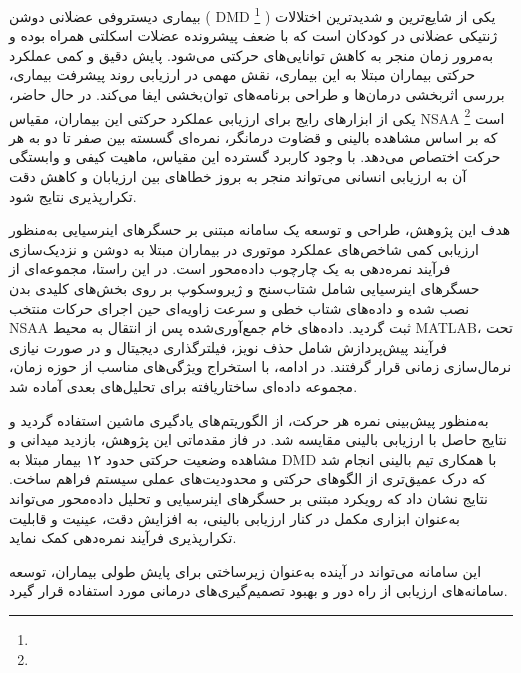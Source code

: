 \begin{PersianAbstract}
	
	بیماری دیستروفی عضلانی دوشن (
	{DMD}
	\footnote{
	}
	)
	یکی از شایع‌ترین و شدیدترین اختلالات ژنتیکی عضلانی در کودکان است که با ضعف پیشرونده عضلات اسکلتی همراه بوده و به‌مرور زمان منجر به کاهش توانایی‌های حرکتی می‌شود. پایش دقیق و کمی عملکرد حرکتی بیماران مبتلا به این بیماری، نقش مهمی در ارزیابی روند پیشرفت بیماری، بررسی اثربخشی درمان‌ها و طراحی برنامه‌های توان‌بخشی ایفا می‌کند. در حال حاضر، یکی از ابزارهای رایج برای ارزیابی عملکرد حرکتی این بیماران، مقیاس
	{NSAA}
	\footnote{  }
	است که بر اساس مشاهده بالینی و قضاوت درمانگر، نمره‌ای گسسته بین صفر تا دو به هر حرکت اختصاص می‌دهد. با وجود کاربرد گسترده این مقیاس، ماهیت کیفی و وابستگی آن به ارزیابی انسانی می‌تواند منجر به بروز خطاهای بین ارزیابان و کاهش دقت تکرارپذیری نتایج شود.
	
	هدف این پژوهش، طراحی و توسعه یک سامانه مبتنی بر حسگرهای اینرسیایی به‌منظور ارزیابی کمی شاخص‌های عملکرد موتوری در بیماران مبتلا به دوشن و نزدیک‌سازی فرآیند نمره‌دهی به یک چارچوب داده‌محور است. در این راستا، مجموعه‌ای از حسگرهای اینرسیایی شامل شتاب‌سنج و ژیروسکوپ بر روی بخش‌های کلیدی بدن نصب شده و داده‌های شتاب خطی و سرعت زاویه‌ای حین اجرای حرکات منتخب NSAA ثبت گردید. داده‌های خام جمع‌آوری‌شده پس از انتقال به محیط {MATLAB}، تحت فرآیند پیش‌پردازش شامل حذف نویز، فیلترگذاری دیجیتال و در صورت نیازی نرمال‌سازی زمانی قرار گرفتند. در ادامه، با استخراج ویژگی‌های مناسب از حوزه زمان، مجموعه داده‌ای ساختاریافته برای تحلیل‌های بعدی آماده شد.
	
	به‌منظور پیش‌بینی نمره هر حرکت، از الگوریتم‌های یادگیری ماشین استفاده گردید و نتایج حاصل با ارزیابی بالینی مقایسه شد. در فاز مقدماتی این پژوهش، بازدید میدانی و مشاهده وضعیت حرکتی حدود ۱۲ بیمار مبتلا به DMD با همکاری تیم بالینی انجام شد که درک عمیق‌تری از الگوهای حرکتی و محدودیت‌های عملی سیستم فراهم ساخت. نتایج نشان داد که رویکرد مبتنی بر حسگرهای اینرسیایی و تحلیل داده‌محور می‌تواند به‌عنوان ابزاری مکمل در کنار ارزیابی بالینی، به افزایش دقت، عینیت و قابلیت تکرارپذیری فرآیند نمره‌دهی کمک نماید.
	
	این سامانه می‌تواند در آینده به‌عنوان زیرساختی برای پایش طولی بیماران، توسعه سامانه‌های ارزیابی از راه دور و بهبود تصمیم‌گیری‌های درمانی مورد استفاده قرار گیرد.
	
	
\end{PersianAbstract}
